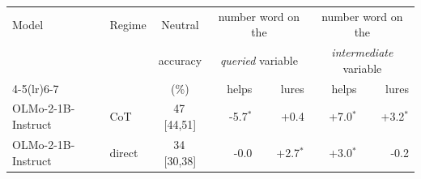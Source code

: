 \begin{tabular}{llcrrrr}
\toprule
Model & Regime & Neutral & \multicolumn{2}{c}{number word on the} & \multicolumn{2}{c}{number word on the} \\
& & accuracy & \multicolumn{2}{c}{\emph{queried} variable} & \multicolumn{2}{c}{\emph{intermediate} variable} \\
\cmidrule(lr){4-5}\cmidrule(lr){6-7}
& & (\%) & helps & lures & helps & lures \\
\midrule
OLMo-2-1B-Instruct & CoT & 47\,{\scriptsize[44,51]} & -5.7$^{*}$ & +0.4 & +7.0$^{*}$ & +3.2$^{*}$ \\
OLMo-2-1B-Instruct & direct & 34\,{\scriptsize[30,38]} & -0.0 & +2.7$^{*}$ & +3.0$^{*}$ & -0.2 \\
\bottomrule
\end{tabular}
